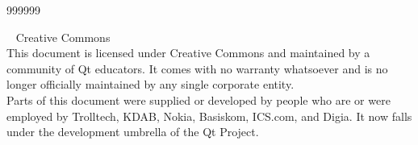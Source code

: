   \begin{slide}{999999}
  \begin{center}
    \vspace{1em}
    \textcopyright~ Creative Commons\\
    \vspace{.5em}
    This document is licensed under Creative Commons and maintained by
    a community of Qt educators. It comes with no warranty whatsoever
    and is no longer officially maintained by any single corporate
    entity. \\
    Parts of this document were supplied or developed by people who are
    or were employed by Trolltech, KDAB, Nokia, Basiskom, ICS.com, and
    Digia. It now falls under the development umbrella of the Qt
    Project. \\
    \end{center}
  \end{slide}
